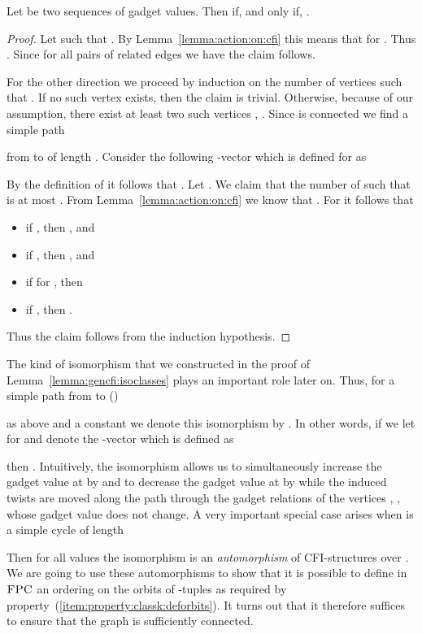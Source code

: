 \documentclass[a4paper,UKenglish]{lipics}
\newcommand{\logic}[1]{\ensuremath{\textsc{#1}}\xspace}
\newcommand{\FPC}{\logic{FPC}}
\theoremstyle{plain}
\begin{document}
\begin{lemma}\label{lemma:gencfi:isoclasses}
 Let  be two sequences of gadget values.
  Then  if, and only if, .
\end{lemma}
\begin{proof}
Let  such that 
.
By Lemma~\ref{lemma:action:on:cfi} this means that 
 for .
Thus . Since for all pairs of related edges  we have  the claim follows.

\smallskip
For the other direction we proceed by induction on the number  of 
vertices  such that .
If no such vertex exists, then the claim is trivial.
Otherwise, because of our assumption, there exist at least two such
vertices , .
Since  is connected we find a simple path 

from  to  of length .
Consider the following -vector  which is defined for 
 as

By the definition of  it follows that .
Let . We claim that the 
number of  such that  is at 
most .
From Lemma~\ref{lemma:action:on:cfi} we know that 
. For  it follows that
\begin{itemize}
 \item if , then , and
 \item if , then , and
 \item if  for , then
 
 \item if , then .
\end{itemize}
Thus the claim follows from the induction hypothesis.
\end{proof}

The kind of isomorphism that we constructed in the proof of 
Lemma~\ref{lemma:gencfi:isoclasses} plays an important role
later on. Thus, for a simple path  from  to  () 

as above and a constant  we denote this isomorphism by 
. 
In other words, if  we let  for  and  denote the -vector which is defined as

then .
Intuitively, the isomorphism  
allows us to simultaneously increase the gadget value at  by  and 
to decrease the gadget value at  by  while the induced twists are 
moved along the path  through the gadget relations of the 
vertices , , whose gadget value does not change.
A very important special case arises when  is a simple cycle of length 

Then for all values  the isomorphism  is an \emph{automorphism} of CFI-structures over . 
We are going to use these automorphisms to show that it is possible to define 
in 
\FPC an ordering on the orbits of -tuples as required 
by property~(\ref{item:property:classk:deforbits}).
It turns out that it therefore suffices to ensure that the graph  is 
sufficiently connected. 
\end{document}
